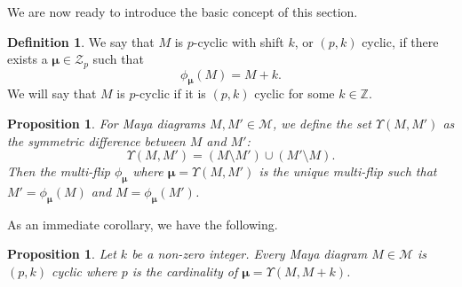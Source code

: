 \documentclass[10pt]{amsart}
\newtheorem{prop}[thm]{Proposition}
\theoremstyle{definition}
\newtheorem{definition}[thm]{Definition}
\numberwithin{equation}{section}
\numberwithin{figure}{section}
\newcommand{\Z}{\mathbb{Z}}
\newcommand{\bmu}{{\boldsymbol{\mu}}}
\newcommand{\cM}{\mathcal{M}}
\newcommand{\cZ}{\mathcal{Z}}
\begin{document}
We are now ready to introduce the basic concept of this section.

\begin{definition}
  We say that $M$ is $p$-cyclic with shift $k$, or $(p,k)$ cyclic, if
  there exists a $\bmu \in \cZ_p$ such that
  \begin{equation}
    \label{eq:cyclicMdef}
    \phi_\bmu(M) = M+k.
  \end{equation}
  We will say that $M$ is $p$-cyclic if it is $(p,k)$ cyclic for some
  $k\in \Z$.
\end{definition}

\begin{prop}
  \label{prop:muM1M2}
  For Maya diagrams $M,M'\in \cM$, we define the set $ \Upsilon(M,M') $ as the symmetric difference between $M$ and $M'$:
  \begin{equation}
    \label{eq:muM1M2}
    \Upsilon(M,M') = (M \setminus M') \cup (M'\setminus M).
  \end{equation}
  Then the multi-flip $\phi_\bmu$ where $\bmu=\Upsilon(M,M')$ is the unique
  multi-flip such that $ M' = \phi_{\bmu}(M)$ and 
  $M = \phi_{\bmu}(M')$.
\end{prop}
As an immediate corollary, we have the following.
\begin{prop}
  Let $k$ be a non-zero integer.  Every Maya diagram $M\in \cM$ is
  $(p,k)$ cyclic where $p$ is the cardinality of
  $\bmu=\Upsilon(M,M+k)$.
\end{prop}

\end{document}
